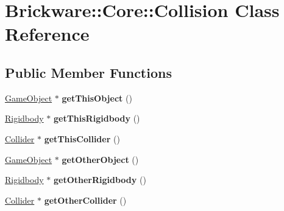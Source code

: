 \hypertarget{classBrickware_1_1Core_1_1Collision}{}\section{Brickware\+:\+:Core\+:\+:Collision Class Reference}
\label{classBrickware_1_1Core_1_1Collision}
\subsection*{Public Member Functions}
\begin{DoxyCompactItemize}
\item 
\hypertarget{classBrickware_1_1Core_1_1Collision_a80ff6ca64efea258ed987352f8008f8b}{}\hyperlink{classBrickware_1_1Core_1_1GameObject}{Game\+Object} $\ast$ {\bfseries get\+This\+Object} ()\label{classBrickware_1_1Core_1_1Collision_a80ff6ca64efea258ed987352f8008f8b}

\item 
\hypertarget{classBrickware_1_1Core_1_1Collision_ad6151a16d35f73d66df8fa36a4d5c11e}{}\hyperlink{classBrickware_1_1Core_1_1Rigidbody}{Rigidbody} $\ast$ {\bfseries get\+This\+Rigidbody} ()\label{classBrickware_1_1Core_1_1Collision_ad6151a16d35f73d66df8fa36a4d5c11e}

\item 
\hypertarget{classBrickware_1_1Core_1_1Collision_ad8d694375494a6b9a8c15faca0300336}{}\hyperlink{classBrickware_1_1Core_1_1Collider}{Collider} $\ast$ {\bfseries get\+This\+Collider} ()\label{classBrickware_1_1Core_1_1Collision_ad8d694375494a6b9a8c15faca0300336}

\item 
\hypertarget{classBrickware_1_1Core_1_1Collision_ac6a45b760c1cbf3a30af36f2aeb7ad77}{}\hyperlink{classBrickware_1_1Core_1_1GameObject}{Game\+Object} $\ast$ {\bfseries get\+Other\+Object} ()\label{classBrickware_1_1Core_1_1Collision_ac6a45b760c1cbf3a30af36f2aeb7ad77}

\item 
\hypertarget{classBrickware_1_1Core_1_1Collision_a82e32b51336bf36f44c788ee4716c6ff}{}\hyperlink{classBrickware_1_1Core_1_1Rigidbody}{Rigidbody} $\ast$ {\bfseries get\+Other\+Rigidbody} ()\label{classBrickware_1_1Core_1_1Collision_a82e32b51336bf36f44c788ee4716c6ff}

\item 
\hypertarget{classBrickware_1_1Core_1_1Collision_ab7fbe45682ed95206071b3fe2706b2c2}{}\hyperlink{classBrickware_1_1Core_1_1Collider}{Collider} $\ast$ {\bfseries get\+Other\+Collider} ()\label{classBrickware_1_1Core_1_1Collision_ab7fbe45682ed95206071b3fe2706b2c2}


\end{DoxyCompactItemize}
